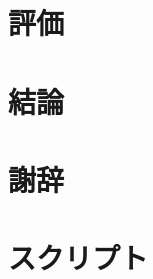 \documentclass[12pt]{b-thesis}
\begin{document}
\begin{comment}
\chapter{プロトコル詳細}
\label{chap:protocol}

\end{comment}

\begin{comment}
\chapter{実装}
\label{chap:implementation}

\end{comment}

\chapter{評価}
\label{chap:evaluation}


\chapter{結論}
\label{chap:conclusion}


\label{chap:thanks}
\chapter*{謝辞}


\thispagestyle{plain}



\appendix
\def\thechapter{付録\Alph{chapter}}
\chapter{スクリプト}
\label{chap:appendix}
\def\thechapter{\Alph{chapter}}

\end{document}
